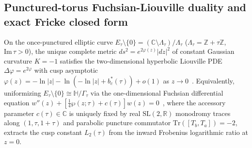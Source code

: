 \documentclass[aps,prd,twocolumn,nofootinbib,floatfix]{revtex4-2}
\begin{document}
\subsection{Punctured-torus Fuchsian-Liouville duality and exact Fricke closed form}

On the once-punctured elliptic curve $E_\tau\setminus\{0\} = (\mathbb{C}\setminus\Lambda_\tau)/\Lambda_\tau$ ($\Lambda_\tau = \mathbb{Z} + \tau\mathbb{Z}$, $\mathrm{Im}\,\tau > 0$), the unique complete metric $ds^2 = e^{2\varphi(z)}|dz|^2$ of constant Gaussian curvature $K = -1$ satisfies the two-dimensional hyperbolic Liouville PDE $\Delta\varphi = e^{2\varphi}$ with cusp asymptotic $\varphi(z) = -\ln|z| - \ln(-\ln|z| + b_c^*(\tau)) + o(1)$ as $z \to 0$~\cite{KrausRothSugawa2011}.
Equivalently, uniformizing $E_\tau\setminus\{0\} \cong \mathbb{H}/\Gamma_\tau$ via the one-dimensional Fuchsian differential equation $w''(z) + [\frac{1}{4}\wp(z;\tau) + c(\tau)]w(z) = 0$~\cite{KeenRauchVasquez1979}, where the accessory parameter $c(\tau) \in \mathbb{C}$ is uniquely fixed by real $\mathrm{SL}(2,\mathbb{R})$ monodromy traces along $(1, \tau, 1+\tau)$ and parabolic puncture commutator $\mathrm{Tr}([T_b, T_a]) = -2$, extracts the cusp constant $L_2(\tau)$ from the inward Frobenius logarithmic ratio at $z = 0$.
\end{document}
